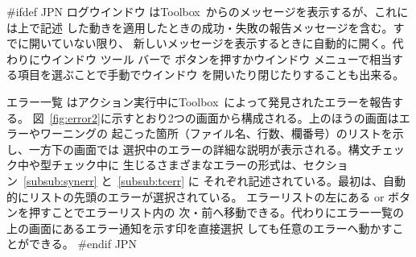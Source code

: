 \documentclass[\pformat,12pt]{article}
\newcommand{\Toolbox}{Toolbox}
\newcommand{\Toolbox}{Toolbox}
\newcommand{\guicmd}[1]{{\sf #1}}
\newcommand{\guicmd}[1]{{\gt #1}}
\begin{document}
#ifdef JPN
\guicmd{ログウインドウ} は\Toolbox\ からのメッセージを表示するが、これには上で記述
した動きを適用したときの成功・失敗の報告メッセージを含む。すでに開いていない限り、
新しいメッセージを表示するときに自動的に開く。代わりに\guicmd{ウインドウ} ツール
バーで 
ボタンを押すか\guicmd{ウインドウ} メニューで相当する項目を選ぶことで手動でウインドウ
を開いたり閉じたりすることも出来る。


\guicmd{エラー一覧} はアクション実行中に\Toolbox\ によって発見されたエラーを報告する。
図~\ref{fig:error2}に示すとおり2つの画面から構成される。上のほうの画面はエラーやワーニングの
起こった箇所（ファイル名、行数、欄番号）のリストを示し、一方下の画面では
選択中のエラーの詳細な説明が表示される。構文チェック中や型チェック中に
生じるさまざまなエラーの形式は、セクション~\ref{subsub:synerr} と~\ref{subsub:tcerr} に
それぞれ記述されている。最初は、自動的にリストの先頭のエラーが選択されている。
エラーリストの左にある {\fbox{\tt >}} or \fbox{{\tt <}} ボタンを押すことでエラーリスト内の
次・前へ移動できる。代わりに\guicmd{エラー一覧}の上の画面にあるエラー通知を示す印を直接選択
しても任意のエラーへ動かすことができる。
#endif JPN
\end{document}
